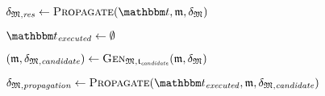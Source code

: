 \begin{algorithmic}[1]
    \algindentskip
        \State \Return{$\bot$} \label{algo:orchestration:provenance:line:bot_input}
    \EndIf
    \algblockskip

    \State $\changetuple{\metamodeltuple{M},\mathvariable{res}} \gets \function{Propagate}(\transformationset{T}, \modeltuple{m}, \changetuple{\metamodeltuple{M}})$
        \State \Return{$\bot$} \label{algo:orchestration:provenance:line:bot_orchestration}
    \EndIf
    \algblockskip

    \State {} %
    \label{algo:orchestration:provenance:line:return_result}
    \algindentskip
\EndProcedure
\vspace{0.5\baselineskip}

    \algindentskip
    \State $\provalgexecuted \gets \emptyset$ \label{algo:orchestration:provenance:line:executed_init}
    \algblockskip

     \label{algo:orchestration:provenance:line:loop_start}
        \algindentskip
        \State $(\modeltuple{m},\changetuple{\metamodeltuple{M},\mathvariable{candidate}}) \gets \generalizationfunction{\metamodeltuple{M}, \provalgcandidate}(\modeltuple{m}, \changetuple{\metamodeltuple{M}})$ \label{algo:orchestration:provenance:line:first_execution}
            \State \Return{$\bot$} \label{algo:orchestration:provenance:line:bot_first_execution}
        \EndIf
        \algblockskip

        \State $\changetuple{\metamodeltuple{M},\mathvariable{propagation}} \gets \function{Propagate}(\provalgexecuted, \modeltuple{m}, \changetuple{\metamodeltuple{M},\mathvariable{candidate}})$ \label{algo:orchestration:provenance:line:recursive_call}
            \State \Return{$\bot$} \label{algo:orchestration:provenance:line:bot_recursion}
        \EndIf
        \algblockskip


\end{algorithmic}
